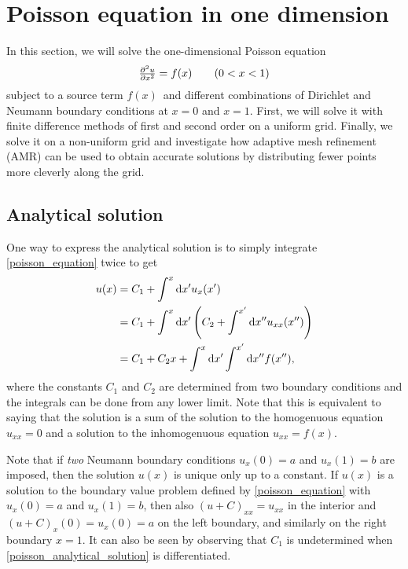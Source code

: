 \section{Poisson equation in one dimension}
\label{task_1}

In this section, we will solve the one-dimensional Poisson equation
\begin{equation}
\pd[2]{u}{x} = f(x) \qquad (0 < x < 1)
\label{poisson_equation}
\end{equation}
subject to a source term $f(x)$ and different combinations of Dirichlet and Neumann boundary conditions at $x = 0$ and $x = 1$.
First, we will solve it with finite difference methods of first and second order on a uniform grid.
Finally, we solve it on a non-uniform grid and investigate how adaptive mesh refinement (AMR) can be used to obtain accurate solutions by distributing fewer points more cleverly along the grid.

\subsection{Analytical solution}

One way to express the analytical solution is to simply integrate \cref{poisson_equation} twice to get
\begin{equation}
\begin{split}
u(x) &= C_1 + \int^x \dif x' u_x(x') \\
     &= C_1 + \int^x \dif x' \left(C_2 + \int^{x'} \dif x'' u_{xx}(x'')\right) \\
     &= C_1 + C_2 x + \int^x \dif x' \int^{x'} \dif x'' f(x''),
\label{poisson_analytical_solution}
\end{split}
\end{equation}
where the constants $C_1$ and $C_2$ are determined from two boundary conditions and the integrals can be done from any lower limit.
Note that this is equivalent to saying that the solution is a sum of the solution to the homogenuous equation $u_{xx} = 0$ and a solution to the inhomogenuous equation $u_{xx} = f(x)$.

Note that if \emph{two} Neumann boundary conditions $u_x(0) = a$ and $u_x(1) = b$ are imposed, then the solution $u(x)$ is unique only up to a constant.
If $u(x)$ is a solution to the boundary value problem defined by \cref{poisson_equation} with $u_x(0) = a$ and $u_x(1) = b$, then also $(u+C)_{xx} = u_{xx}$ in the interior and $(u+C)_x(0) = u_x(0) = a$ on the left boundary, and similarly on the right boundary $x=1$.
It can also be seen by observing that $C_1$ is undetermined when \ref{poisson_analytical_solution} is differentiated.

